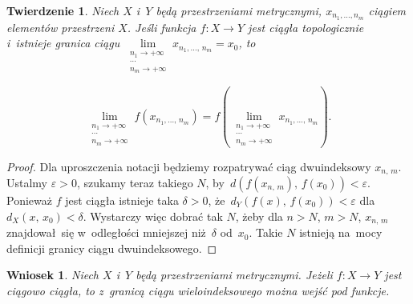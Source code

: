 \documentclass[a4paper,11pt]{article}
\newtheorem{theorem}{Twierdzenie} %
\newtheorem{corollary}{Wniosek}
\begin{document}
\begin{theorem}

  Niech $X$ i~$Y$ będą przestrzeniami metrycznymi,
  $x_{ n_{ 1 }, \ldots, n_{ m } }$ ciągiem elementów przestrzeni $X$.
  Jeśli funkcja $f: X \to Y$ jest ciągła topologicznie i~istnieje
  granica ciągu
  $\lim\limits_{ \substack{ n_{ 1 } \to +\infty \\ \cdots \\ n_{ m } \to
      +\infty } } x_{ n_{ 1 }, \ldots, \, n_{ m } } = x_{ 0 }$, to

  \begin{equation}
    \label{eq:RS-Vol-I-s01-11}
    \lim\limits_{ \substack{ n_{ 1 } \to +\infty \\ \cdots \\  n_{ m } \to +\infty } }
    f( x_{ n_{ 1 }, \ldots, \, n_{ m } } )
    = f( \lim\limits_{ \substack{ n_{ 1 } \to +\infty \\ \cdots \\ n_{ m } \to
        +\infty } } x_{ n_{ 1 }, \ldots, \, n_{ m } } ).
  \end{equation}

\end{theorem}



\begin{proof}

  Dla uproszczenia notacji będziemy rozpatrywać ciąg dwuindeksowy
  $x_{ n, \, m }$. Ustalmy $\varepsilon > 0$, szukamy teraz takiego $N$,
  by~$d( f( x_{ n, \, m } ),\, f( x_{ 0 } ) ) < \varepsilon$. Ponieważ $f$
  jest ciągła istnieje taka $\delta > 0$, \linebreak
  że~$d_{ Y }( f( x ),\, f( x_{ 0 } ) ) < \varepsilon$
  dla~$d_{ X }( x,\, x_{ 0 } ) < \delta$. Wystarczy więc dobrać tak $N$,
  żeby dla $n > N$, $m > N$, $x_{ n, \, m }$ znajdował~się
  w~odległości mniejszej niż~$\delta$ od~$x_{ 0 }$. Takie $N$ istnieją
  na~mocy definicji granicy ciągu dwuindeksowego.

\end{proof}





\begin{corollary}

  Niech $X$ i~$Y$ będą przestrzeniami metrycznymi. Jeżeli $f: X \to Y$
  jest ciągowo ciągła, to z~granicą ciągu wieloindeksowego można wejść
  pod funkcje.

\end{corollary}
\end{document}
